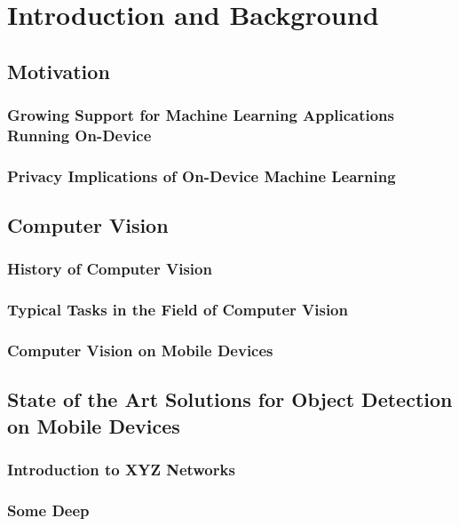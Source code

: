 \documentclass[11pt,
               a4paper,
               bibtotoc,
               idxtotoc,
               headsepline,
               footsepline,
               footexclude,
               BCOR12mm,
               DIV13,
               openany,   %
               ]
               {scrbook}
\begin{document}
\mainmatter
\part{Introduction and Background}

\chapter{Motivation}

\section{Growing Support for Machine Learning Applications Running On-Device}

\section{Privacy Implications of On-Device Machine Learning}

\chapter{Computer Vision}

\section{History of Computer Vision}

\section{Typical Tasks in the Field of Computer Vision}

\section{Computer Vision on Mobile Devices}

\chapter{State of the Art Solutions for Object Detection on Mobile Devices}

\section{Introduction to XYZ Networks}

\section{Some Deep}
\end{document}
